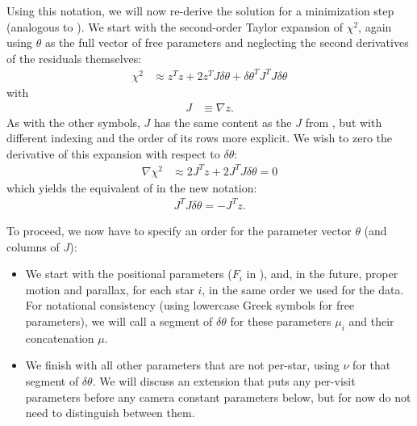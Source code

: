 Using this notation, we will now re-derive the solution for a minimization step (analogous to ).
We start with the second-order Taylor expansion of $\chi^2$, again using $\theta$ as the full vector of free parameters and neglecting the second derivatives of the residuals themselves:
\begin{align}
    \chi^2 &\approx z^Tz + 2z^T J\delta\theta
    + \delta\theta^T J^T\!J \delta\theta
\end{align}
with
\begin{align}
    J &\equiv \nabla z.
\end{align}
As with the other symbols, $J$ has the same content as the $J$ from , but with different indexing and the order of its rows more explicit.
We wish to zero the derivative of this expansion with respect to $\delta\theta$:
\begin{align}
    \nabla\chi^2 &\approx 2J^T\!z + 2J^T\!J \delta\theta = 0
\end{align}
which yields the equivalent of  in the new notation:
\begin{align}
    J^T\!J \delta\theta = -J^T\!z. \label{eq:vp_gradient_equation}
\end{align}

To proceed, we now have to specify an order for the parameter vector $\theta$ (and columns of $J$):
\begin{itemize}
    \item We start with the positional parameters ($F_i$ in ), and, in the future, proper motion and parallax, for each star $i$, in the same order we used for the data.
    For notational consistency (using lowercase Greek symbols for free parameters), we will call a segment of $\delta\theta$ for these parameters $\mu_i$ and their concatenation $\mu$.
    \item We finish with all other parameters that are not per-star, using $\nu$ for that segment of $\delta\theta$.
    We will discuss an extension that puts any per-visit parameters before any camera constant parameters below, but for now do not need to distinguish between them.
\end{itemize}

